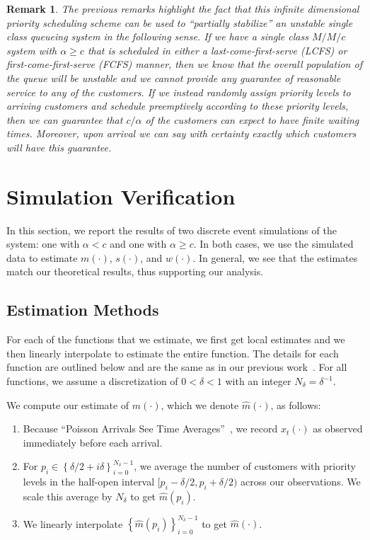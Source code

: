 \documentclass[conference]{IEEEtran}
\newtheorem{remark}{Remark}
\newcommand{\set}[1]{\left\{#1\right\}}
\begin{document}
\begin{remark}
  The previous remarks highlight the fact that this infinite
  dimensional priority scheduling scheme can be used to ``partially
  stabilize'' an unstable single class queueing system in the
  following sense. If we have a single class $M/M/c$ system with
  $\alpha \geq c$ that is scheduled in either a last-come-first-serve
  (LCFS) or first-come-first-serve (FCFS) manner, then we know that
  the overall population of the queue will be unstable and we cannot
  provide any guarantee of reasonable service to any of the
  customers. If we instead randomly assign priority levels to arriving
  customers and schedule preemptively according to these priority
  levels, then we can guarantee that $c/\alpha$ of the customers can
  expect to have finite waiting times. Moreover, upon arrival we can
  say with certainty exactly which customers will have this guarantee.
\end{remark}


\section{Simulation Verification\label{sec:sim}}
In this section, we report the results of two discrete event
simulations of the system: one with $\alpha < c$ and one with $\alpha
\geq c$.  In both cases, we use the simulated data to estimate
$m(\cdot)$, $s(\cdot)$, and $w(\cdot)$. In general, we see that the
estimates match our theoretical results, thus supporting our analysis.


\subsection{Estimation Methods}
For each of the functions that we estimate, we first get local
estimates and we then linearly interpolate to estimate the entire
function. The details for each function are outlined below and are the
same as in our previous work~\cite{Master_ACC_2017}. For all
functions, we assume a discretization of $0 < \delta < 1$ with an
integer $N_\delta = \delta^{-1}$.

We compute our estimate of $m(\cdot)$, which we denote $\hat
m(\cdot)$, as follows:
\begin{enumerate}
\item Because ``Poisson Arrivals See Time
  Averages''~\cite{Wolff_1982}, we record $x_t(\cdot)$ as observed
  immediately before each arrival.
\item For $p_i \in \set{\delta/2 + i\delta }_{i=0}^{N_\delta - 1}$, we
  average the number of customers with priority levels in the
  half-open interval $[p_i - \delta/2, p_i + \delta/2)$ across our
  observations. We scale this average by $N_\delta$ to get $\hat
  m(p_i)$.
\item We linearly interpolate $\set{\hat m(p_i)}_{i=0}^{N_\delta - 1}$
  to get $\hat m(\cdot)$.
\end{enumerate}
\end{document}
